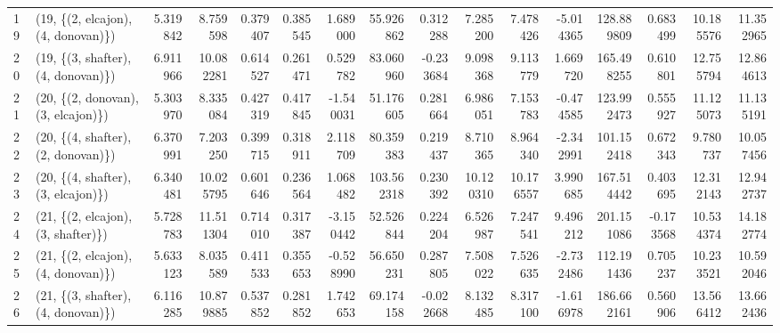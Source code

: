\begin{tabular}{llrrrrrrrrrrrrrr}
19 &  (19, \{(2, elcajon), (4, donovan)\}) &   5.319842 &   8.759598 &   0.379407 &  0.385545 &   1.689000 &    55.926862 &   0.312288 &   7.285200 &   7.478426 &  -5.014365 &  128.889809 &  0.683499 &  10.185576 &  11.352965 \\
20 &  (19, \{(3, shafter), (4, donovan)\}) &   6.911966 &  10.082281 &   0.614527 &  0.261471 &   0.529782 &    83.060960 &  -0.233684 &   9.098368 &   9.113779 &   1.669720 &  165.498255 &  0.610801 &  12.755794 &  12.864613 \\
21 &  (20, \{(2, donovan), (3, elcajon)\}) &   5.303970 &   8.335084 &   0.427319 &  0.417845 &  -1.540031 &    51.176605 &   0.281664 &   6.986051 &   7.153783 &  -0.474585 &  123.992473 &  0.555927 &  11.125073 &  11.135191 \\
22 &  (20, \{(4, shafter), (2, donovan)\}) &   6.370991 &   7.203250 &   0.399715 &  0.318911 &   2.118709 &    80.359383 &   0.219437 &   8.710365 &   8.964340 &  -2.342991 &  101.152418 &  0.672343 &   9.780737 &  10.057456 \\
23 &  (20, \{(4, shafter), (3, elcajon)\}) &   6.340481 &  10.025795 &   0.601646 &  0.236564 &   1.068482 &   103.562318 &   0.230392 &  10.120310 &  10.176557 &   3.990685 &  167.514442 &  0.403695 &  12.312143 &  12.942737 \\
24 &  (21, \{(2, elcajon), (3, shafter)\}) &   5.728783 &  11.511304 &   0.714010 &  0.317387 &  -3.150442 &    52.526844 &   0.224204 &   6.526987 &   7.247541 &   9.496212 &  201.151086 & -0.173568 &  10.534374 &  14.182774 \\
25 &  (21, \{(2, elcajon), (4, donovan)\}) &   5.633123 &   8.035589 &   0.411533 &  0.355653 &  -0.528990 &    56.650231 &   0.287805 &   7.508022 &   7.526635 &  -2.732486 &  112.191436 &  0.705237 &  10.233521 &  10.592046 \\
26 &  (21, \{(3, shafter), (4, donovan)\}) &   6.116285 &  10.879885 &   0.537852 &  0.281852 &   1.742653 &    69.174158 &  -0.022668 &   8.132485 &   8.317100 &  -1.616978 &  186.662161 &  0.560906 &  13.566412 &  13.662436 \\
\bottomrule
\end{tabular}
